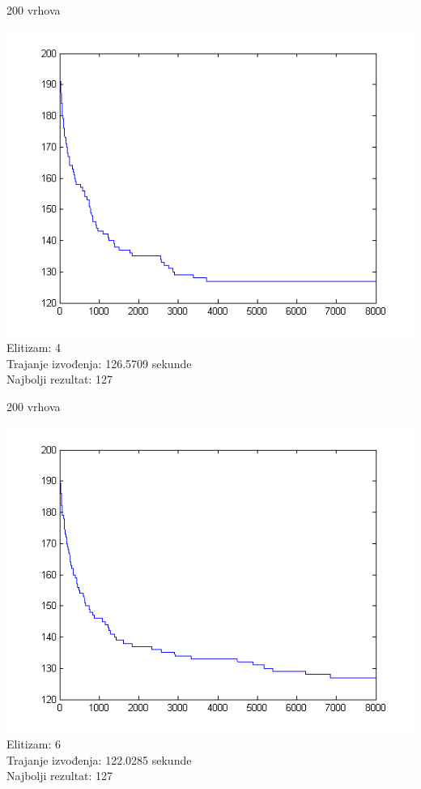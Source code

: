 \documentclass{beamer}
\begin{document}
\begin{frame}{200 vrhova}
\begin{center}
\includegraphics[scale = 0.55]{par4.png}\\
\tiny
Elitizam: 4\\
Trajanje izvođenja: 126.5709 sekunde\\
Najbolji rezultat: 127\\
\end{center}
\end{frame}


\begin{frame}{200 vrhova}
\begin{center}
\includegraphics[scale = 0.55]{par6.png}\\
\tiny
Elitizam: 6\\
Trajanje izvođenja: 122.0285 sekunde\\
Najbolji rezultat: 127\\
\end{center}
\end{frame}
\end{document}
